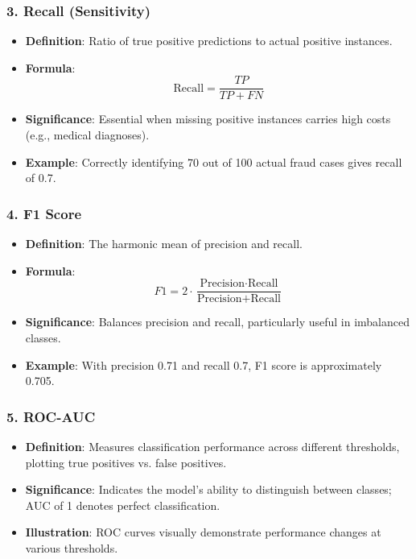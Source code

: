 \documentclass[aspectratio=169]{beamer}
\begin{document}
\begin{frame}[fragile]
    \frametitle{3. Recall (Sensitivity)}
    \begin{itemize}
        \item \textbf{Definition}: Ratio of true positive predictions to actual positive instances.
        \item \textbf{Formula}:
        \begin{equation}
        \text{Recall} = \frac{TP}{TP + FN}
        \end{equation}
        \item \textbf{Significance}: Essential when missing positive instances carries high costs (e.g., medical diagnoses).
        \item \textbf{Example}: Correctly identifying 70 out of 100 actual fraud cases gives recall of 0.7.
    \end{itemize}
\end{frame}

\begin{frame}[fragile]
    \frametitle{4. F1 Score}
    \begin{itemize}
        \item \textbf{Definition}: The harmonic mean of precision and recall.
        \item \textbf{Formula}:
        \begin{equation}
        F1 = 2 \cdot \frac{\text{Precision} \cdot \text{Recall}}{\text{Precision} + \text{Recall}}
        \end{equation}
        \item \textbf{Significance}: Balances precision and recall, particularly useful in imbalanced classes.
        \item \textbf{Example}: With precision 0.71 and recall 0.7, F1 score is approximately 0.705.
    \end{itemize}
\end{frame}

\begin{frame}[fragile]
    \frametitle{5. ROC-AUC}
    \begin{itemize}
        \item \textbf{Definition}: Measures classification performance across different thresholds, plotting true positives vs. false positives.
        \item \textbf{Significance}: Indicates the model's ability to distinguish between classes; AUC of 1 denotes perfect classification.
        \item \textbf{Illustration}: ROC curves visually demonstrate performance changes at various thresholds.
    \end{itemize}
\end{frame}
\end{document}
